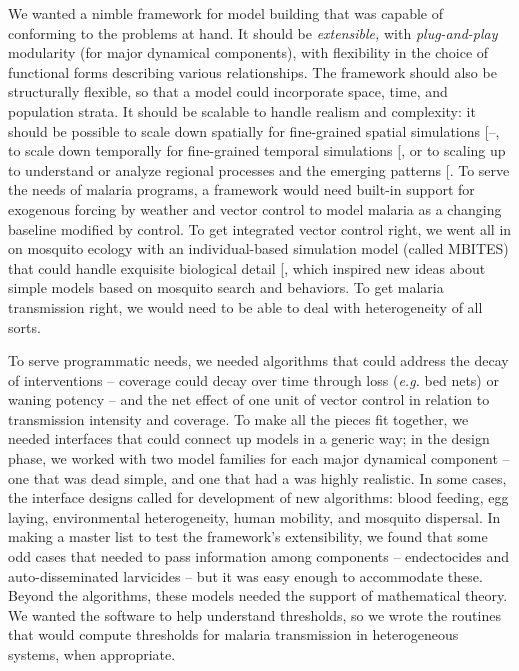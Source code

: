 \documentclass[
]{book}
\begin{document}
We wanted a nimble framework for model building that was capable of conforming to the problems at hand. It should be \emph{extensible,} with \emph{plug-and-play} modularity (for major dynamical components), with flexibility in the choice of functional forms describing various relationships. The framework should also be structurally flexible, so that a model could incorporate space, time, and population strata.
It should be scalable to handle realism and complexity: it should be possible to scale down spatially for fine-grained spatial simulations {[}--\citeproc{ref-PerkinsTA2013HeterogeneityMixing}{8}{]}, to scale down temporally for fine-grained temporal simulations {[}\citeproc{ref-WuSL2020MBITES}{9}{]}, or to scaling up to understand or analyze regional processes and the emerging patterns {[}\citeproc{ref-TatemAJ2010InternationalPopulation}{10}{]}.
To serve the needs of malaria programs, a framework would need built-in support for exogenous forcing by weather and vector control to model malaria as a changing baseline modified by control.
To get integrated vector control right, we went all in on mosquito ecology with an individual-based simulation model (called MBITES) that could handle exquisite biological detail {[}\citeproc{ref-WuSL2020MBITES}{9}{]}, which inspired new ideas about simple models based on mosquito search and behaviors.
To get malaria transmission right, we would need to be able to deal with heterogeneity of all sorts.

To serve programmatic needs, we needed algorithms that could address the decay of interventions
-- coverage could decay over time through loss (\emph{e.g.} bed nets) or waning potency --
and the net effect of one unit of vector control in relation to transmission intensity and coverage.
To make all the pieces fit together, we needed interfaces that could connect up models in a generic way; in the design phase, we worked with two model families for each major dynamical component -- one that was dead simple, and one that had a was highly realistic.
In some cases, the interface designs called for development of new algorithms: blood feeding, egg laying, environmental heterogeneity, human mobility, and mosquito dispersal.
In making a master list to test the framework's extensibility, we found that some odd cases that needed to pass information among components -- endectocides and auto-disseminated larvicides -- but it was easy enough to accommodate these.
Beyond the algorithms, these models needed the support of mathematical theory.
We wanted the software to help understand thresholds, so we wrote the routines that would compute thresholds for malaria transmission in heterogeneous systems, when appropriate.
\end{document}
